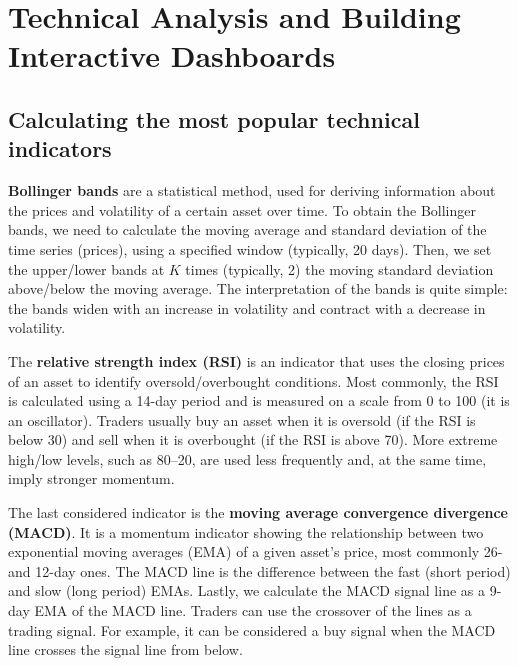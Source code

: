 \chapter{Technical Analysis and Building Interactive Dashboards\label{ch05}}
\section{Calculating the most popular technical indicators}
\textbf{Bollinger bands} are a statistical method, used for deriving information about the prices and volatility of a certain asset over time. To obtain the Bollinger bands, we need to calculate the moving average and standard deviation of the time series (prices), using a specified window (typically, 20 days). Then, we set the upper/lower bands at $K$ times (typically, 2) the moving standard deviation above/below the moving average. The interpretation of the bands is quite simple: the bands widen with an increase in volatility and contract with a decrease in volatility.

The \textbf{relative strength index (RSI)} is an indicator that uses the closing prices of an asset to identify oversold/overbought conditions. Most commonly, the RSI is calculated using a 14-day period and is measured on a scale from 0 to 100 (it is an oscillator). Traders usually buy an asset when it is oversold (if the RSI is below 30) and sell when it is overbought (if the RSI is above 70). More extreme high/low levels, such as 80–20, are used less frequently and, at the same time, imply stronger momentum.

The last considered indicator is the \textbf{moving average convergence divergence (MACD)}. It is a momentum indicator showing the relationship between two exponential moving averages (EMA) of a given asset's price, most commonly 26- and 12-day ones. The MACD line is the difference between the fast (short period) and slow (long period) EMAs. Lastly, we calculate the MACD signal line as a 9-day EMA of the MACD line. Traders can use the crossover of the lines as a trading signal. For example, it can be considered a buy signal when the MACD line crosses the signal line from below.

